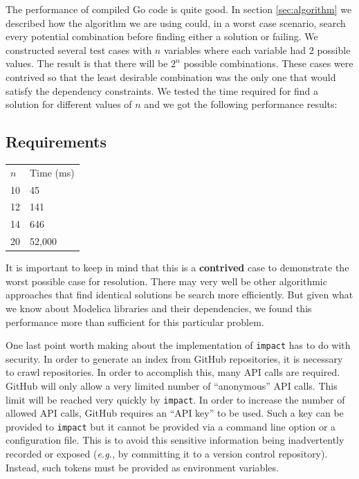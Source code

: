 \documentclass[11pt,a4paper,twocolumn]{article}
\newcommand{\code}[1]{\texttt{#1}} %
\begin{document}
The performance of compiled Go code is quite good.  In section
\ref{sec:algorithm} we described how the algorithm we are using could,
in a worst case scenario, search every potential combination before
finding either a solution or failing.  We constructed several test
cases with $n$ variables where each variable had $2$ possible values.
The result is that there will be $2^n$ possible combinations.  These
cases were contrived so that the least desirable combination was the
only one that would satisfy the dependency constraints.  We tested the
time required for find a solution for different values of $n$ and we
got the following performance results:

\subsection{Requirements}

\begin{center}
\begin{tabular}{ll}
$n$ & Time (ms) \\
10 & 45 \\
12 & 141 \\
14 & 646 \\
20 & 52,000 \\
\end{tabular}
\end{center}

It is important to keep in mind that this is a {\bf contrived} case to
demonstrate the worst possible case for resolution.  There may very
well be other algorithmic approaches that find identical solutions be
search more efficiently.  But given what we know about Modelica
libraries and their dependencies, we found this performance more than
sufficient for this particular problem.

One last point worth making about the implementation of \code{impact}
has to do with security.  In order to generate an index from GitHub
repositories, it is necessary to crawl repositories.  In order to
accomplish this, many API calls are required.  GitHub will only allow
a very limited number of ``anonymous'' API calls.  This limit will be
reached very quickly by \code{impact}.  In order to increase the
number of allowed API calls, GitHub requires an ``API key'' to be
used.  Such a key can be provided to \code{impact} but it cannot be
provided via a command line option or a configuration file.  This is
to avoid this sensitive information being inadvertently recorded or
exposed ({\it e.g.,} by committing it to a version control
repository).  Instead, such tokens must be provided as environment
variables.
\end{document}
